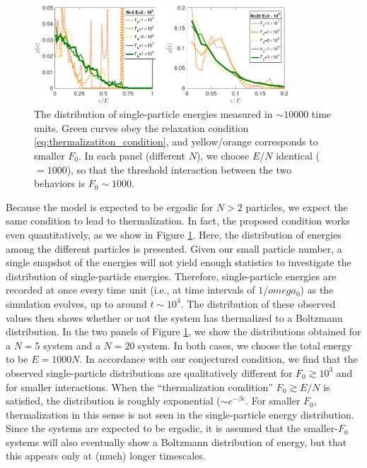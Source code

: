 \documentclass[onecolumn,pra]{revtex4-1}
\begin{document}
\begin{figure}[tbhp]
\centering
%
\includegraphics[width=0.85\textwidth]{ZhiyuPictures/Boltzmann_2panels_01-crop.pdf}
%
\caption{The distribution of single-particle energies measured in $\sim 10000$ time units. Green
  curves obey the relaxation condition \eqref{eq:thermalizatiton_condition}, and yellow/orange
  corresponds to smaller $F_0$.  In each panel (different $N$), we choose $E/N$ identical ($=1000$),
  so that the threshold interaction between the two behaviors is  $F_0\sim1000$. }
\label{fig:thermalization5}
\end{figure}



Because the model is expected to be ergodic for $N>2$ particles, we expect the same condition to
lead to thermalization.  In fact, the proposed condition works even quantitatively, as we show in
Figure \ref{fig:thermalization5}.  Here, the distribution of energies among the different particles
is presented.  Given our small particle number, a single snapshot of the energies will not yield
enough statistics to investigate the distribution of single-particle energies.  Therefore,
single-particle energies are recorded at once every time unit (i.e., at time intervals of
$1/omega_0$) as the simulation evolves, up to around $t\sim10^4$.  The distribution of these
observed values then shows whether or not the system has thermalized to a Boltzmann distribution.
In the two panels of Figure \ref{fig:thermalization5}, we show the distributions obtained for a
$N=5$ system and a $N=20$ system.  In both cases, we choose the total energy to be $E=1000N$.  In
accordance with our conjectured condition, we find that the observed single-particle distributions
are qualitatively different for $F_0\gtrsim10^3$ and for smaller interactions.  When the
``thermalization condition'' $F_0\gtrsim E/N$ is satisfied, the distribution is roughly exponential
($\sim e^{-\beta\epsilon}$.  For smaller $F_0$, thermalization in this sense is not seen in the
single-particle energy distribution.  Since the systems are expected to be ergodic, it is assumed
that the smaller-$F_0$ systems will also eventually show a Boltzmann distribution of energy, but
that this appears only at (much) longer timescales.
\end{document}
